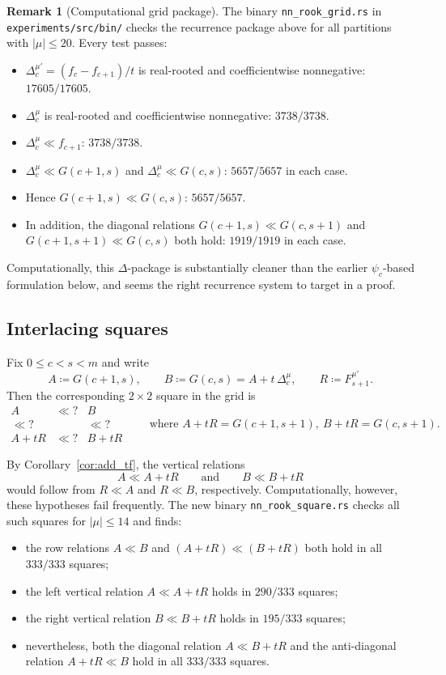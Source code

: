 \documentclass[11pt,reqno]{amsart}
\theoremstyle{definition}
\newtheorem{remark}[theorem]{Remark}
\newcommand{\interl}{\ll}
\begin{document}
\begin{remark}[Computational grid package]\label{rem:grid_package}
The binary \texttt{nn\_rook\_grid.rs}
in \texttt{experiments/src/bin/}
checks the recurrence package above for all partitions with $|\mu| \leq 20$.
Every test passes:
\begin{itemize}
\item $\Delta_c^{\mu'} = (f_c - f_{c+1})/t$ is real-rooted and coefficientwise nonnegative:
  $17605/17605$.
\item $\Delta_c^\mu$ is real-rooted and coefficientwise nonnegative:
  $3738/3738$.
\item $\Delta_c^\mu \interl f_{c+1}$:
  $3738/3738$.
\item $\Delta_c^\mu \interl G(c+1,s)$ and $\Delta_c^\mu \interl G(c,s)$:
  $5657/5657$ in each case.
\item Hence $G(c+1,s) \interl G(c,s)$:
  $5657/5657$.
\item In addition, the diagonal relations
  $G(c+1,s) \interl G(c,s+1)$ and
  $G(c+1,s+1) \interl G(c,s)$
  both hold:
  $1919/1919$ in each case.
\end{itemize}
Computationally, this $\Delta$-package is substantially cleaner than the
earlier $\psi_c$-based formulation below, and seems the right recurrence
system to target in a proof.
\end{remark}

\subsection{Interlacing squares}\label{sec:squares}

Fix $0 \leq c < s < m$ and write
\[
  A \coloneqq G(c+1,s),
  \qquad
  B \coloneqq G(c,s) = A + t\,\Delta_c^\mu,
  \qquad
  R \coloneqq F_{s+1}^{\mu'}.
\]
Then the corresponding $2 \times 2$ square in the grid is
\[
  \begin{matrix}
    A & \interl? & B \\
    \interl? & & \interl? \\
    A + tR & \interl? & B + tR
  \end{matrix}
  \qquad
  \text{where }
  A + tR = G(c+1,s+1),\ B + tR = G(c,s+1).
\]

By Corollary~\ref{cor:add_tf}, the vertical relations
\[
  A \interl A+tR
  \qquad\text{and}\qquad
  B \interl B+tR
\]
would follow from $R \interl A$ and $R \interl B$, respectively.
Computationally, however, these hypotheses fail frequently.
The new binary \texttt{nn\_rook\_square.rs}
checks all such squares for $|\mu| \leq 14$ and finds:
\begin{itemize}
\item the row relations
  $A \interl B$ and $(A+tR) \interl (B+tR)$
  both hold in all $333/333$ squares;
\item the left vertical relation $A \interl A+tR$ holds in $290/333$ squares;
\item the right vertical relation $B \interl B+tR$ holds in $195/333$ squares;
\item nevertheless, both the diagonal relation
  $A \interl B+tR$ and the anti-diagonal relation
  $A+tR \interl B$
  hold in all $333/333$ squares.
\end{itemize}
\end{document}
